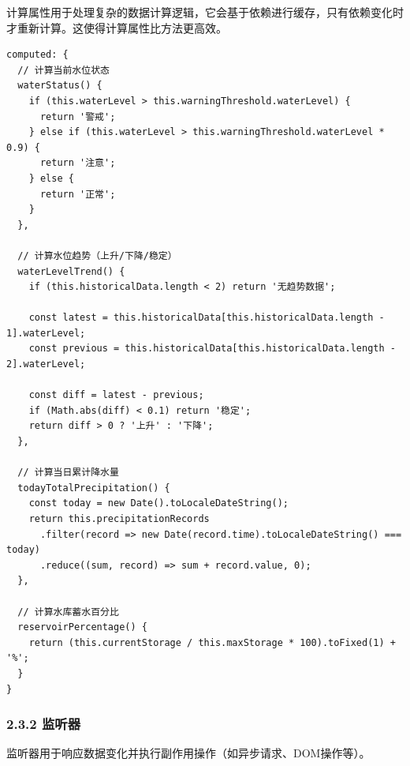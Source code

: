 计算属性用于处理复杂的数据计算逻辑，它会基于依赖进行缓存，只有依赖变化时才重新计算。这使得计算属性比方法更高效。

\begin{lstlisting}
computed: {
  // 计算当前水位状态
  waterStatus() {
    if (this.waterLevel > this.warningThreshold.waterLevel) {
      return '警戒';
    } else if (this.waterLevel > this.warningThreshold.waterLevel * 0.9) {
      return '注意';
    } else {
      return '正常';
    }
  },
  
  // 计算水位趋势（上升/下降/稳定）
  waterLevelTrend() {
    if (this.historicalData.length < 2) return '无趋势数据';
    
    const latest = this.historicalData[this.historicalData.length - 1].waterLevel;
    const previous = this.historicalData[this.historicalData.length - 2].waterLevel;
    
    const diff = latest - previous;
    if (Math.abs(diff) < 0.1) return '稳定';
    return diff > 0 ? '上升' : '下降';
  },
  
  // 计算当日累计降水量
  todayTotalPrecipitation() {
    const today = new Date().toLocaleDateString();
    return this.precipitationRecords
      .filter(record => new Date(record.time).toLocaleDateString() === today)
      .reduce((sum, record) => sum + record.value, 0);
  },
  
  // 计算水库蓄水百分比
  reservoirPercentage() {
    return (this.currentStorage / this.maxStorage * 100).toFixed(1) + '%';
  }
}
\end{lstlisting}

\subsubsection{2.3.2 监听器}\label{ux76d1ux542cux5668}

监听器用于响应数据变化并执行副作用操作（如异步请求、DOM操作等）。

